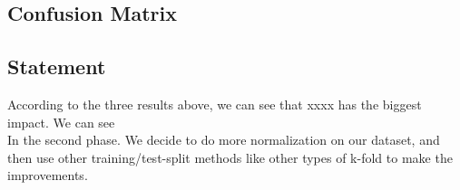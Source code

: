 \documentclass[stu, floatsintext, 10pt, donotrepeattitle, natbib]{apa7}
\begin{document}
\subsection{Confusion Matrix}

\subsection{Statement}
According to the three results above, we can see that xxxx has the biggest impact. We can see\\
In the second phase. We decide to do more normalization on our dataset, and then use other training/test-split methods like other types of k-fold to make the improvements.

\cite[]{greenwade93}

\newpage





\newpage
\renewcommand\refname{\textbf{References}}

\end{document}
